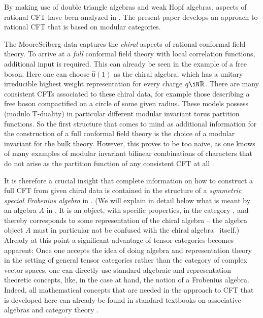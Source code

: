 \noindent
By making use of double triangle algebras and weak Hopf algebras, aspects 
of rational CFT have been analyzed in \cite{bppz2,pezu6,pezu7,pezu8}.
The present paper develops an approach to rational CFT that is
based on modular categories.

\medskip

The Moore\hy Seiberg data captures the {\em chiral\/} aspects of rational 
conformal field theory. To arrive at a {\em full\/} conformal field 
theory with local correlation functions, additional input is required.  
This can already be seen in the example of a free boson. Here one can 
choose $\hat{\mathfrak u}(1)$ as the chiral algebra, which has a unitary 
irreducible highest weight representation for every charge $q\iN\mathbb{R}$. 
There are many consistent CFTs associated to these chiral data, for example 
those describing a free boson compactified on a circle of some given radius.
These models possess (modulo T-duality) in particular different modular
invariant torus partition functions. So the first structure that comes to mind 
as additional information for the construction of a full conformal field theory
is the choice of a modular invariant for the bulk theory. However, this 
proves to be too naive, as one knows of many examples of modular invariant 
bilinear combinations of characters that do not arise as the partition 
function of any consistent CFT at all \cite{vers,scya5,fusS,gann17}.

It is therefore a crucial insight \cite{fuRs} that complete information on 
how to construct a full CFT from given chiral data is contained in the 
structure of a {\em symmetric special Frobenius algebra\/} in \calc. (We will 
explain in detail below what is meant by an algebra $A$ in \calc. It is 
an object, with specific properties, in the category \calc, and 
thereby corresponds to some representation of the chiral algebra -- the
algebra object $A$ must in particular not be confused with the chiral algebra 
\CA\ itself.) Already at this point a significant advantage of tensor 
categories becomes apparent: Once one accepts the idea of doing algebra 
and representation theory in the setting of general tensor categories
rather than the category of complex vector spaces, one can directly use 
standard algebraic and
representation theoretic concepts, like, in the case at hand, the notion 
of a Frobenius algebra. Indeed, all mathematical concepts that are needed 
in the approach to CFT that is developed here
can already be found in standard textbooks on associative algebras 
\cite{CUre,FAde} and category theory \cite{MAcl,KAss}.


